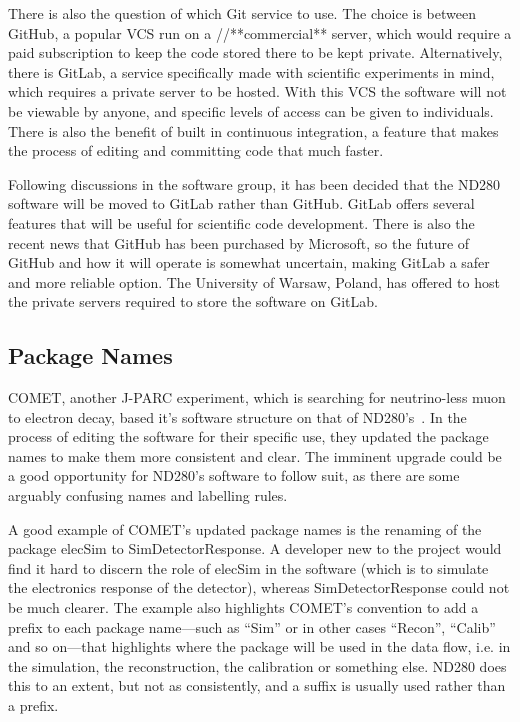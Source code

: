 \documentclass[aps,pra,12pt,notitlepage,tightenlines]{revtex4-1}
\begin{document}
There is also the question of which Git service to use. The choice is between GitHub, a popular VCS run on a //**commercial** server, which would require a paid subscription to keep the code stored there to be kept private. Alternatively, there is GitLab, a service specifically made with scientific experiments in mind, which requires a private server to be hosted. With this VCS the software will not be viewable by anyone, and specific levels of access can be given to individuals. There is also the benefit of built in continuous integration, a feature that makes the process of editing and committing code that much faster.

Following discussions in the software group, it has been decided that the ND280 software will be moved to GitLab rather than GitHub. GitLab offers several features that will be useful for scientific code development. There is also the recent news that GitHub has been purchased by Microsoft, so the future of GitHub and how it will operate is somewhat uncertain, making GitLab a safer and more reliable option. The University of Warsaw, Poland, has offered to host the private servers required to store the software on GitLab.

\subsection{Package Names}

COMET, another J-PARC experiment, which is searching for neutrino-less muon to electron decay, based it's software structure on that of ND280's~\cite{Wu2017}. In the process of editing the software for their specific use, they updated the package names to make them more consistent and clear. The imminent upgrade could be a good opportunity for ND280's software to follow suit, as there are some arguably confusing names and labelling rules.

A good example of COMET's updated package names is the renaming of the package elecSim to SimDetectorResponse. A developer new to the project would find it hard to discern the role of elecSim in the software (which is to simulate the electronics response of the detector), whereas SimDetectorResponse could not be much clearer. The example also highlights COMET's convention to add a prefix to each package name---such as ``Sim'' or in other cases ``Recon'', ``Calib'' and so on---that highlights where the package will be used in the data flow, i.e. in the simulation, the reconstruction, the calibration or something else. ND280 does this to an extent, but not as consistently, and a suffix is usually used rather than a prefix. 
\end{document}
